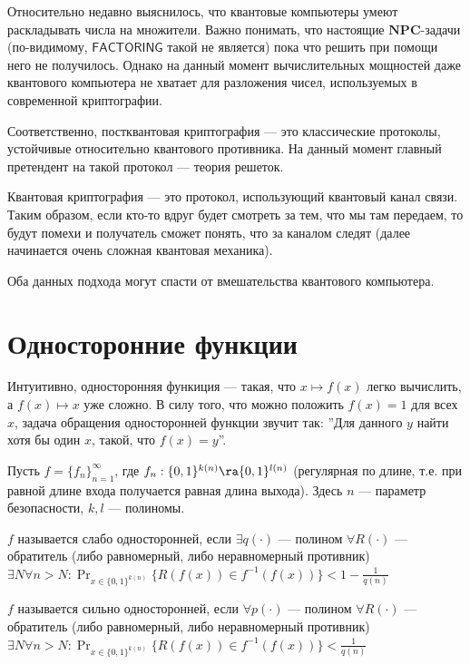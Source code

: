 Относительно недавно выяснилось, что квантовые компьютеры умеют раскладывать числа на множители. Важно понимать, что настоящие \(\mathbf{NPC}\)-задачи (по-видимому, \(\mathsf{FACTORING}\) такой не является) пока что решить при помощи него не получилось. Однако на данный момент вычислительных мощностей даже квантового компьютера не хватает для разложения чисел, используемых в современной криптографии.

Соответственно, постквантовая криптография --- это классические протоколы, устойчивые относительно квантового противника. На данный момент главный претендент на такой протокол --- теория решеток.

Квантовая криптография --- это протокол, использующий квантовый канал связи. Таким образом, если кто-то вдруг будет смотреть за тем, что мы там передаем, то будут помехи и получатель сможет понять, что за каналом следят (далее начинается очень сложная квантовая механика).

Оба данных подхода могут спасти от вмешательства квантового компьютера. 

\section{Односторонние функции}

Интуитивно, односторонняя функиция --- такая, что \(x \mapsto f(x)\) легко вычислить, а \(f(x) \mapsto x\) уже сложно. В силу того, что можно положить \(f(x) = 1\) для всех \(x\), задача обращения односторонней функции звучит так: ''Для данного \(y\) найти хотя бы один \(x\), такой, что \(f(x) = y\)''.

Пусть \(f = \{f_n\}_{n = 1}^\infty\), где \(f_n: \{0, 1\}^{k(n)} \ra \{0, 1\}^{l(n)}\) (регулярная по длине, т.е. при равной длине входа получается равная длина выхода). Здесь \(n\) --- параметр безопасности, \(k, l\) --- полиномы.

\begin{definition}
    \(f\) называется слабо односторонней, если \(\exists q(\cdot)\) --- полином \(\forall R(\cdot)\) --- обратитель (либо равномерный, либо неравномерный противник) \(\exists N \forall n > N: \Pr_{x \in \{0, 1\}^{k(n)}}\{R(f(x)) \in f^{-1}(f(x))\} < 1 - \frac{1}{q(n)}\)
\end{definition}

\begin{definition}
    \(f\) называется сильно односторонней, если \(\forall p(\cdot)\) --- полином \(\forall R(\cdot)\) --- обратитель (либо равномерный, либо неравномерный противник) \(\exists N \forall n > N: \Pr_{x \in \{0, 1\}^{k(n)}}\{R(f(x)) \in f^{-1}(f(x))\} < \frac{1}{q(n)}\)
\end{definition}

